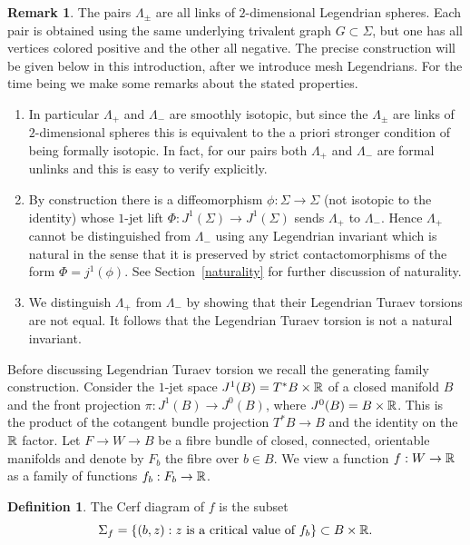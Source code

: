 \documentclass[11pt]{article}
\numberwithin{equation}{section}\providecommand{\dpl}{\displaystyle}
\newenvironment{enumeratea}
{\bgroup\def\theenumi{\alph{enumi}}\begin{enumerate}}
{\end{enumerate}\egroup}
\theoremstyle{plain}
\theoremstyle{definition}
\newtheorem{definition}[theorem]{Definition}
\newtheorem{remark}[theorem]{Remark}
\begin{document}
\begin{remark} The pairs $\Lambda_\pm$ are all links of $2$-dimensional Legendrian spheres. Each pair is obtained using the same underlying trivalent graph $G \subset \Sigma$, but one has all vertices colored positive and the other all negative. The precise construction will be given below in this introduction, after we introduce mesh Legendrians. For the time being we make some remarks about the stated properties.\begin{enumeratea}
\item
In particular $\Lambda_+$ and $\Lambda_-$ are smoothly isotopic, but since the $\Lambda_{\pm}$ are links of $2$-dimensional spheres this is equivalent to the a priori stronger condition of being formally isotopic. In fact, for our pairs both $\Lambda_+$ and $\Lambda_-$ are formal unlinks and this is easy to verify explicitly.
\item
By construction there is a diffeomorphism $\phi: \Sigma \to \Sigma$ (not isotopic to the identity) whose $1$-jet lift $\Phi:J^1(\Sigma) \to J^1(\Sigma)$ sends $\Lambda_+$ to $\Lambda_-$. Hence $\Lambda_+$ cannot be distinguished from $\Lambda_-$ using any Legendrian invariant which is natural in the sense that it is preserved by strict contactomorphisms of the form $\Phi=j^1(\phi)$. See Section~\ref{naturality} for further discussion of naturality.
\item
We distinguish $\Lambda_+$ from $\Lambda_-$ by showing that their Legendrian Turaev torsions are not equal. It follows that the Legendrian Turaev torsion is not a natural invariant.
\end{enumeratea}
\end{remark}

Before discussing Legendrian Turaev torsion we recall the generating family construction. Consider the $1$-jet space $J^1(B)=T^*B \times \mathbb{R}$ of a closed manifold $B$ and the front projection $\pi: J^1(B) \to J^0(B)$, where $J^0(B)=B \times \mathbb{R}$. This is the product of the cotangent bundle projection $T^*B \to B$ and the identity on the $\mathbb{R}$ factor. Let $F \to W \to B$ be a fibre bundle of closed, connected, orientable manifolds and denote by $F_b$ the fibre over $b \in B$. We view a function $f:W \to \mathbb{R}$ as a family of functions $f_b:F_b \to \mathbb{R}$.

\begin{definition} The Cerf diagram of $f$ is the subset
\[
\Sigma_f=\{ (b,z) : \text{$z$ is a critical value of $f_b$} \} \subset B \times \mathbb{R}.
\]
\end{definition}
\end{document}

